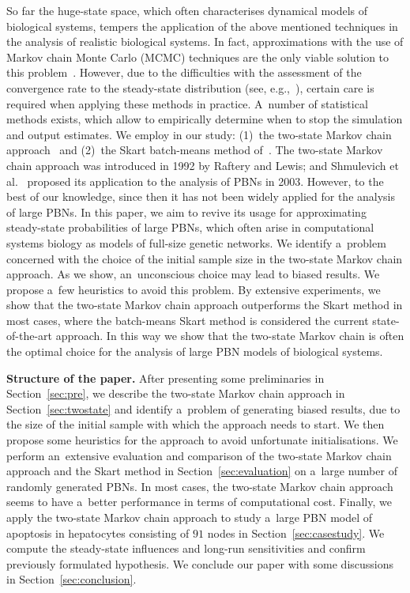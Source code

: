 \documentclass[runningheads,a4paper]{llncs}
\begin{document}
So far the huge-state space, which often characterises dynamical models of biological systems,
tempers the application of the above mentioned techniques in the analysis of realistic biological
systems. In fact, approximations with the use of Markov chain Monte Carlo (MCMC) techniques are
the only viable solution to this problem~\cite{SGHDZ03}. However, due to the difficulties with
the assessment of the convergence rate to the steady-state distribution (see, e.g.,~\cite{CC96}),
certain care is required when applying these methods in practice. A~number of statistical methods
exists, which allow to empirically determine when to stop the simulation and output estimates.
We employ in our study: (1)~the two-state Markov chain approach~\cite{RL92} and (2)~the Skart
batch-means method of~\cite{TWLS08}. The two-state Markov chain approach was introduced in 1992 by
Raftery and Lewis; and Shmulevich et al.~\cite{SGHDZ03} proposed its application to the analysis
of PBNs in 2003. However, to the best of our knowledge, since then it has not been widely applied
for the analysis of large PBNs. In this paper, we aim to revive its usage for approximating
steady-state probabilities of large PBNs, which often arise in computational systems biology as
models of full-size genetic networks. We identify a~problem concerned with the choice of the
initial sample size in the two-state Markov chain approach. As we show, an~unconscious choice may
lead to biased results. We propose a~few heuristics to avoid this problem. By extensive
experiments, we show that the two-state Markov chain approach outperforms the Skart method in most
cases, where the batch-means Skart method is considered the current state-of-the-art approach. In
this way we show that the two-state Markov chain is often the optimal choice for the analysis of
large PBN models of biological systems.

\medskip\noindent
{\bf Structure of the paper.}
After presenting some preliminaries in Section~\ref{sec:pre}, we describe the two-state Markov
chain approach in Section~\ref{sec:twostate} and identify a~problem of generating biased results,
due to the size of the initial sample with which the approach needs to start. We then propose some
heuristics for the approach to avoid unfortunate initialisations. We perform an~extensive
evaluation and comparison of the two-state Markov chain approach and the Skart method in
Section~\ref{sec:evaluation} on a~large number of randomly generated PBNs. In most cases, the
two-state Markov chain approach seems to have a~better performance in terms of computational cost.
Finally, we apply the two-state Markov chain approach to study a~large PBN model of apoptosis in
hepatocytes consisting of $91$ nodes in Section~\ref{sec:casestudy}. We compute
the steady-state influences and long-run sensitivities and confirm previously formulated
hypothesis.
We conclude our paper with some discussions in Section~\ref{sec:conclusion}.
\end{document}
